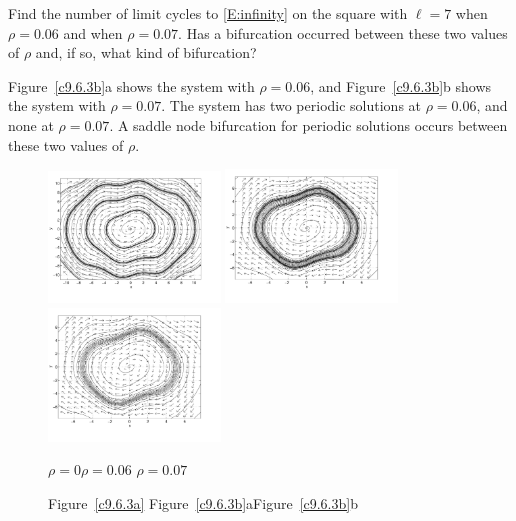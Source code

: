 \documentclass{ximera}
\begin{document}
\begin{computerExercise} \label{c9.6.3b}
Find the number of limit cycles to \eqref{E:infinity} on the square 
with $\ell=7$ when $\rho=0.06$ and when $\rho=0.07$.  Has a bifurcation
 occurred between these two values of $\rho$ and, if so, what kind of 
bifurcation?

\begin{solution}

Figure~\ref{c9.6.3b}a shows the system with $\rho = 0.06$, and 
Figure~\ref{c9.6.3b}b shows the system with $\rho = 0.07$.  The system
has two periodic solutions at $\rho = 0.06$, and none at $\rho = 0.07$.
A saddle node bifurcation for periodic solutions occurs between these
two values of $\rho$.

\begin{figure}[htb]
                       \centerline{%
                       \includegraphics[width=1.8in]{exfigure/9-6-3a.pdf}
                       \includegraphics[width=1.8in]{exfigure/9-6-3b.pdf}
                       \includegraphics[width=1.8in]{exfigure/9-6-3c.pdf}}
		\centerline{$\rho = 0$\hspace{1.3in}$\rho = 0.06$
\hspace{1.3in}$\rho = 0.07$}
		\centerline{Figure~\ref{c9.6.3a}\hspace{1.2in}
Figure~\ref{c9.6.3b}a\hspace{1.2in}Figure~\ref{c9.6.3b}b}
\end{figure}

\end{solution}
\end{computerExercise}
\end{document}
